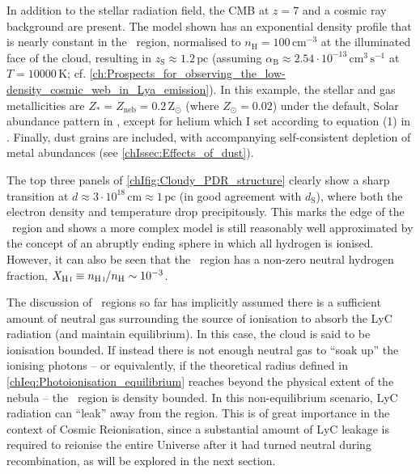 In addition to the stellar radiation field, the CMB at $z = 7$ and a cosmic ray background are present. The model shown has an exponential density profile that is nearly constant in the \HII\ region, normalised to $n_\text{H} = 100 \, \mathrm{cm^{-3}}$ at the illuminated face of the cloud, resulting in $z_\text{S} \approx 1.2 \, \mathrm{pc}$ (assuming $\alpha_\text{B} \approx 2.54 \cdot 10^{-13} \, \mathrm{cm^{3} \, s^{-1}}$ at $T = \num{10000} \, \mathrm{K}$; cf. \cref{ch:Prospects_for_observing_the_low-density_cosmic_web_in_Lya_emission}). In this example, the stellar and gas metallicities are $Z_* = Z_\text{neb} = 0.2 \, \mathrm{Z_\odot}$ (where $Z_\odot = 0.02$) under the default, Solar abundance pattern in , except for helium which I set according to equation (1) in \citet{2004ApJS..153...75G}. Finally, dust grains are included, with accompanying self-consistent depletion of metal abundances (see \cref{chIssec:Effects_of_dust}).

The top three panels of \cref{chIfig:Cloudy_PDR_structure} clearly show a sharp transition at $d \approx 3 \cdot 10^{18} \, \mathrm{cm} \approx 1 \, \mathrm{pc}$ (in good agreement with $d_\text{S}$), where both the electron density and temperature drop precipitously. This marks the edge of the \HII\ region and shows a more complex model is still reasonably well approximated by the concept of an abruptly ending \citeauthor{1939ApJ....89..526S} sphere in which all hydrogen is ionised. However, it can also be seen that the \HII\ region has a non-zero neutral hydrogen fraction, $X_\text{\ion{H}{I}} \equiv n_\text{\ion{H}{I}}/n_\text{H} \sim 10^{-3}$.

The discussion of \HII\ regions so far has implicitly assumed there is a sufficient amount of neutral gas surrounding the source of ionisation to absorb the LyC radiation (and maintain equilibrium). In this case, the cloud is said to be ionisation bounded. If instead there is not enough neutral gas to ``soak up'' the ionising photons -- or equivalently, if the theoretical \citeauthor{1939ApJ....89..526S} radius defined in \cref{chIeq:Photoionisation_equilibrium} reaches beyond the physical extent of the nebula -- the \HII\ region is density bounded. In this non-equilibrium scenario, LyC radiation can ``leak'' away from the region. This is of great importance in the context of Cosmic Reionisation, since a substantial amount of LyC leakage is required to reionise the entire Universe after it had turned neutral during recombination, as will be explored in the next section.

